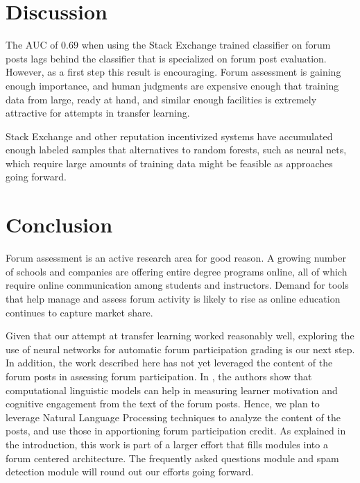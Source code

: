 \section{Discussion}
The AUC of $0.69$ when using the Stack Exchange trained classifier on
forum posts lags behind the classifier that is specialized on forum
post evaluation. However, as a first step this result is
encouraging. Forum assessment is gaining enough importance, and human
judgments are expensive enough that training data from large, ready at
hand, and similar enough facilities is extremely attractive for
attempts in transfer learning.

Stack Exchange and other reputation incentivized systems have
accumulated enough labeled samples that alternatives to random
forests, such as neural nets, which require large amounts of training
data might be feasible as approaches going forward. 

\section{Conclusion}

Forum assessment is an active research area for good reason. A growing
number of schools and companies are offering entire degree programs
online, all of which require online communication among students and
instructors. Demand for tools that help manage and assess forum
activity is likely to rise as online education continues to capture
market share.

Given that our attempt at transfer learning worked reasonably well,
exploring the use of neural networks for automatic forum participation
grading is our next step. In addition, the work described here has not yet leveraged the content of the forum posts in assessing forum participation. In \cite{wen2014linguistic}, the authors show that computational linguistic models can help in measuring learner motivation and cognitive engagement from the text of the forum posts. Hence, we plan to leverage Natural Language Processing techniques to analyze the content of the posts, and use those in apportioning forum participation credit.
As explained in the introduction, this work is part of a larger effort
that fills modules into a forum centered architecture. The frequently
asked questions module and spam detection module will round out our efforts going forward.

  
